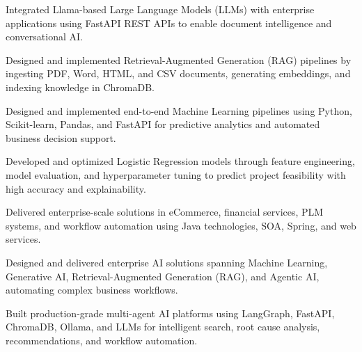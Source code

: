 \documentclass[letterpaper]{deedy-resume} %
\begin{document}
\begin{minipage}[t]{0.66\textwidth}
\begin{tightitemize}
\item Integrated Llama-based Large Language Models (LLMs) with enterprise applications using FastAPI REST APIs to enable document intelligence and conversational AI.
\item Designed and implemented Retrieval-Augmented Generation (RAG) pipelines by ingesting PDF, Word, HTML, and CSV documents, generating embeddings, and indexing knowledge in ChromaDB.
\end{tightitemize}

\begin{tightitemize}
\item Designed and implemented end-to-end Machine Learning pipelines using Python, Scikit-learn, Pandas, and FastAPI for predictive analytics and automated business decision support.
\item Developed and optimized Logistic Regression models through feature engineering, model evaluation, and hyperparameter tuning to predict project feasibility with high accuracy and explainability.
\end{tightitemize}

\begin{tightitemize}
\item Delivered enterprise-scale solutions in eCommerce, financial services, PLM systems, and workflow automation using Java technologies, SOA, Spring, and web services.
\end{tightitemize}

\begin{tightitemize}
\item Designed and delivered enterprise AI solutions spanning Machine Learning, Generative AI, Retrieval-Augmented Generation (RAG), and Agentic AI, automating complex business workflows.
\item Built production-grade multi-agent AI platforms using LangGraph, FastAPI, ChromaDB, Ollama, and LLMs for intelligent search, root cause analysis, recommendations, and workflow automation.
\end{tightitemize}




\end{minipage}
\end{document}
